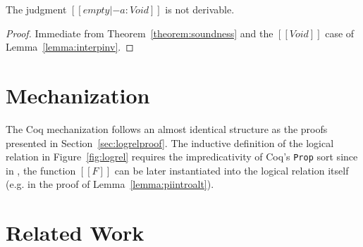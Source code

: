 \documentclass[nonacm]{acmart}
\begin{document}
\begin{corollary}
  \label{corollary:consistency}
  The judgment $[[empty |- a : Void ]]$ is not derivable.
\end{corollary}
\begin{proof}
  Immediate from Theorem~\ref{theorem:soundness} and the $[[Void]]$ case of Lemma~\ref{lemma:interpinv}.
\end{proof}

\section{Mechanization}
\label{sec:logrelmech}
The Coq mechanization follows an almost identical structure as the
proofs presented in Section~\ref{sec:logrelproof}. The inductive
definition of the logical relation in Figure~\ref{fig:logrel} requires
the impredicativity of Coq's \texttt{Prop} sort since in ,
the function $[[F]]$ can be later instantiated into the logical
relation itself (e.g. in the proof of Lemma~\ref{lemma:piintroalt}).

\section{Related Work}
\label{sec:relatedwork}








\end{document}
